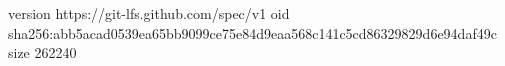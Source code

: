 version https://git-lfs.github.com/spec/v1
oid sha256:abb5acad0539ea65bb9099ce75e84d9eaa568c141c5cd86329829d6e94daf49c
size 262240
